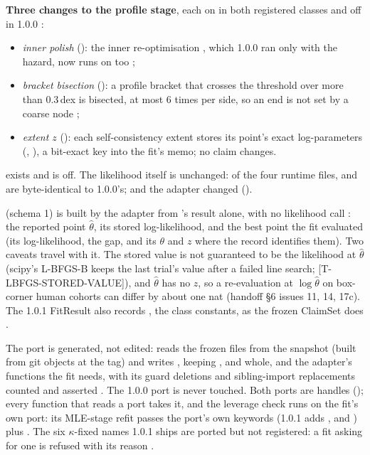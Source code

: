 \textbf{Three changes to the profile stage}, each on in both registered classes and off in 1.0.0
:
\begin{itemize}[nosep]
  \item \emph{inner polish} (): the inner re-optimisation , which 1.0.0 ran only
    with the hazard, now runs on  too ;
  \item \emph{bracket bisection} (): a profile bracket that crosses the threshold over more than
    0.3\,dex is bisected, at most 6 times per side, so an end is not set by a coarse node
    ;
  \item \emph{extent $z$} (): each self-consistency extent stores its point's exact log-parameters
    (, ), a bit-exact key into the fit's memo; no claim changes.
\end{itemize}
 exists and is off. The likelihood itself is unchanged: of the four runtime files,  and
 are byte-identical to 1.0.0's;  and the adapter changed
().

\textbf{} (schema 1) is built by the adapter from 's result alone, with no
likelihood call : the reported point $\hat\theta$, its stored
log-likelihood, and the best point the fit evaluated (its log-likelihood, the gap, and its $\theta$ and $z$ where the
record identifies them). Two caveats travel with it. The stored value is not guaranteed to be the likelihood at
$\hat\theta$ (scipy's L-BFGS-B keeps the last trial's value after a failed line search; [T-LBFGS-STORED-VALUE]), and
$\hat\theta$ has no $z$, so a re-evaluation at $\log\hat\theta$ on box-corner human cohorts can differ by about one nat
(handoff \S6 issues 11, 14, 17c). The 1.0.1 FitResult also records , the class constants,
as the frozen ClaimSet does .

\tplImpl
The port is generated, not edited:  reads the frozen files from the snapshot
 (built from git objects at the tag) and writes , keeping
,  and  whole, and the adapter's functions the fit needs, with its
guard deletions and sibling-import replacements counted and asserted . The 1.0.0
port is never touched. Both ports are handles (); every function that reads a port takes it, and the
leverage check runs on the fit's own port: its MLE-stage refit passes the port's own  keywords (1.0.1 adds
,  and ) plus  .
The six $\kappa$-fixed names 1.0.1 ships are ported but not registered: a fit asking for one is refused with its reason
.

